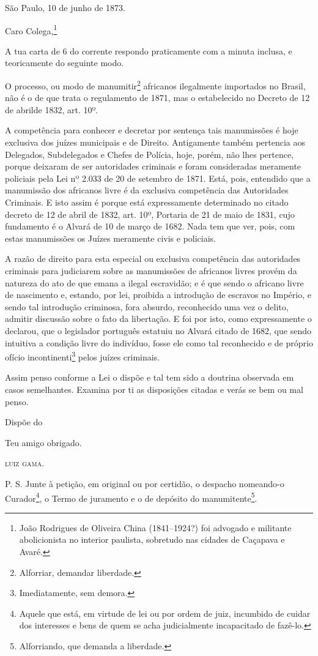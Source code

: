 \asterisc{}

São Paulo, 10 de junho de 1873.

Caro Colega,\footnote{ João Rodrigues de Oliveira China (1841--1924?)
  foi advogado e militante abolicionista no interior paulista, sobretudo
  nas cidades de Caçapava e Avaré.}

A tua carta de 6 do corrente respondo praticamente com a minuta inclusa,
e teoricamente do seguinte modo.

O processo, ou modo de manumitir\footnote{ Alforriar, demandar
  liberdade.} africanos ilegalmente importados no Brasil, não é o de que
trata o regulamento de 1871, mas o estabelecido no Decreto de 12 de
abrilde 1832, art. 10º.

A competência para conhecer e decretar por sentença tais manumissões é
hoje exclusiva dos juízes municipais e de Direito. Antigamente também
pertencia aos Delegados, Subdelegados e Chefes de Polícia, hoje, porém,
não lhes pertence, porque deixaram de ser autoridades criminais e foram
consideradas meramente policiais pela Lei nº 2.033 de 20 de setembro de
1871. Está, pois, entendido que a manumissão dos africanos livre é da
exclusiva competência das {Autoridades Criminais}. E isto assim é porque
está expressamente determinado no citado decreto de 12 de abril de 1832,
art. 10º, Portaria de 21 de maio de 1831, cujo fundamento é o Alvará de
10 de março de 1682. Nada tem que ver, pois, com estas manumissões os
Juízes meramente civis e policiais.

A razão de direito para esta especial ou exclusiva competência das
autoridades criminais para judiciarem sobre as manumissões de africanos
livres provém da natureza do ato de que emana a ilegal escravidão; e é
que sendo o africano livre de nascimento e, estando, por lei, proibida a
introdução de escravos no Império, e sendo tal introdução criminosa,
fora absurdo, reconhecido uma vez o delito, admitir discussão sobre o
fato da libertação. E foi por isto, como expressamente o declarou, que o
legislador português estatuiu no Alvará citado de 1682, que sendo
intuitiva a condição livre do indivíduo, fosse ele como tal reconhecido
e de próprio ofício incontinenti\footnote{ Imediatamente, sem demora.}
pelos juízes criminais.

Assim penso conforme a Lei o dispõe e tal tem sido a doutrina observada
em casos semelhantes. Examina por ti as disposições citadas e verás se
bem ou mal penso.

Dispõe do

Teu amigo obrigado.
\begin{flushright}
\textsc{luiz gama}.
\end{flushright}
P. S. Junte à petição, em original ou por certidão, o despacho
nomeando-o Curador\footnote{ Aquele que está, em virtude de lei ou por
  ordem de juiz, incumbido de cuidar dos interesses e bens de quem se
  acha judicialmente incapacitado de fazê-lo.}, o Termo de juramento e o
de depósito do manumitente\footnote{ Alforriando, que demanda a
  liberdade.}.

